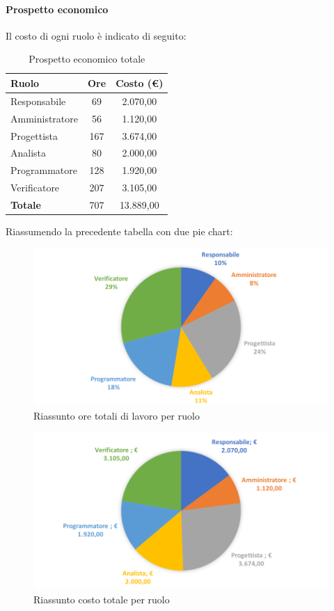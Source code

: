 \documentclass[../PianoDiProgetto.tex]{subfiles}
\begin{document}
			\newpage
			\paragraph{Prospetto economico}
			Il costo di ogni ruolo è indicato di seguito:
			\begin{table}[h]
				\centering
				\begin{tabular}{l * {2}{c}}
				\toprule
				\textbf{Ruolo} & \textbf{Ore} & \textbf{Costo (\euro{})} \\
				\midrule
				Responsabile & 69 & 2.070,00 \\
				Amministratore & 56 & 1.120,00 \\
				Progettista & 167 & 3.674,00 \\
				Analista & 80 & 2.000,00 \\		
				Programmatore & 128 & 1.920,00 \\		
				Verificatore & 207 & 3.105,00 \\				
				\midrule		
				\textbf{Totale} & 707 & 13.889,00 \\
				\bottomrule	
				\end{tabular}
				\caption{Prospetto economico totale}		
			\end{table}
			
			Riassumendo la precedente tabella con due pie chart:	
			\begin{figure}[!h]
				\centering
				\includegraphics[width=\textwidth]{Preventivo/Immagini/rendicontato_oreRuolo.png}
				\caption{Riassunto ore totali di lavoro per ruolo}
			\end{figure}	
			\newpage
			\begin{figure}[!h]
				\centering
				\includegraphics[width=\textwidth]{Preventivo/Immagini/rendicontato_costoRuolo.png}
				\caption{Riassunto costo totale per ruolo}
			\end{figure}
\end{document}
